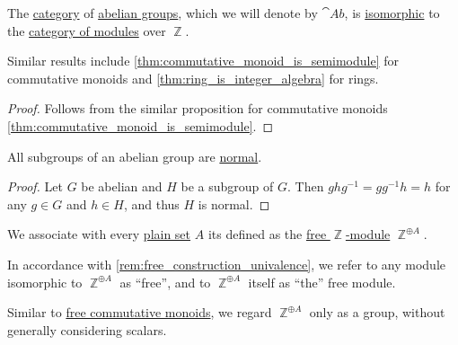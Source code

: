 \begin{proposition}\label{thm:category_of_abelian_groups}
  The \hyperref[def:category]{category} of \hyperref[def:abelian_group]{abelian groups}, which we will denote by \( \cat{Ab} \), is \hyperref[rem:category_similarity/isomorphism]{isomorphic} to the \hyperref[def:module/category]{category of modules} over \( \BbbZ \).
\end{proposition}
\begin{comments}
  \item Similar results include \cref{thm:commutative_monoid_is_semimodule} for commutative monoids and \cref{thm:ring_is_integer_algebra} for rings.
\end{comments}
\begin{proof}
  Follows from the similar proposition for commutative monoids \cref{thm:commutative_monoid_is_semimodule}.
\end{proof}

\begin{proposition}\label{thm:abelian_normal_subgroups}
  All subgroups of an abelian group are \hyperref[def:normal_subgroup]{normal}.
\end{proposition}
\begin{proof}
  Let \( G \) be abelian and \( H \) be a subgroup of \( G \). Then \( g h g^{-1} = gg^{-1} h = h \) for any \( g \in G \) and \( h \in H \), and thus \( H \) is normal.
\end{proof}

\begin{definition}\label{def:free_abelian_group}\mimprovised
  We associate with every \hyperref[def:set]{plain set} \( A \) its  defined as the \hyperref[def:free_semimodule]{free \( \BbbZ \)-module} \( \BbbZ^{\oplus A} \).
\end{definition}
\begin{comments}
  \item In accordance with \cref{rem:free_construction_univalence}, we refer to any module isomorphic to \( \BbbZ^{\oplus A} \) as \enquote{free}, and to \( \BbbZ^{\oplus A} \) itself as \enquote{the} free module.

  \item Similar to \hyperref[def:free_commutative_monoid]{free commutative monoids}, we regard \( \BbbZ^{\oplus A} \) only as a group, without generally considering scalars.
\end{comments}

